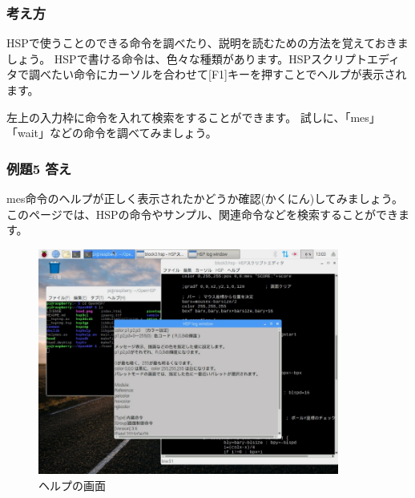 \subsubsection*{考え方}

HSPで使うことのできる命令を調べたり、説明を読むための方法を覚えておきましょう。
HSPで書ける命令は、色々な種類があります。HSPスクリプトエディタで調べたい命令にカーソルを合わせて[F1]キーを押すことでヘルプが表示されます。

左上の入力枠に命令を入れて検索をすることができます。
試しに、「mes」「wait」などの命令を調べてみましょう。

\subsubsection*{例題5 答え}

mes命令のヘルプが正しく表示されたかどうか確認(かくにん)してみましょう。
このページでは、HSPの命令やサンプル、関連命令などを検索することができます。

\begin{figure}[H]
    \begin{center}
        \includegraphics[keepaspectratio,width=9.895cm,height=7.421cm]{text02-img/text02-img029.jpg}
        \caption{ヘルプの画面}
    \end{center}
\end{figure}